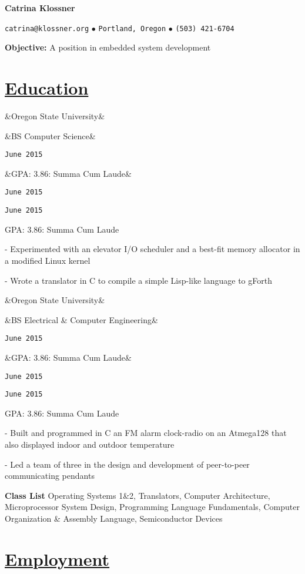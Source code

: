 \documentclass[11pt]{article}
\newcommand{\heading}[1]{
    \section*{\uline{\hfill #1}}
}
\newcommand{\squish}{
    \setlength{\itemsep}{0.5pt}
    \setlength{\parskip}{0pt}
    \setlength{\parsep}{0.5pt}
}
\newcommand{\when}[1]{
    \hfill \texttt{#1}
}
\newcommand{\experience}[4]{
    \ifx&#1&
       \item[{#1}]
       \when{}
    \else
        \ifx&#2&
            \item[{#1}]
            \when{#4}
        \else
            \ifx&#3&
                \item[{#1}, \emph{#2}]
                \when{#4}
            \else
                \item[{#1}, \emph{#2}]
                \when{#4}
                \item{#3}
                \when{}
            \fi
        \fi
    \fi
}
\newcommand{\contact}[4]{
    \centerline{
        \large       
        \texttt{#1}
        $\bullet$
        \texttt{#2}
        $\bullet$
        \texttt{#3}
    }
    \centerline{
        \emph{#4}
    }
}
\newcommand{\skill}[2]{
    \textbf{#1} \hfill #2
}
\newcommand{\CPP}{
    C\hspace{-.05em}\raisebox{.4ex}{\tiny\bf +}\hspace{-.10em}\raisebox{.4ex}{\tiny\bf +}
}
\begin{document}
\centerline{{\Huge \bf Catrina Klossner}}
\bigskip

\contact{catrina@klossner.org}
        {Portland, Oregon}
        {(503) 421-6704}
        {}

%
%
%
%

\large{\textbf{Objective:}}
	A position in embedded system development

\heading{Education}%

\begin{description}
\squish   
\experience{Oregon State University}
           {BS Computer Science}
           {GPA: 3.86: Summa Cum Laude}
           {June 2015}

	- Experimented with an elevator I/O scheduler and a best-fit memory allocator in a modified Linux kernel

	- Wrote a translator in C to compile a simple Lisp-like language to gForth 

\experience{Oregon State University}
           {BS Electrical \& Computer Engineering}
           {GPA: 3.86: Summa Cum Laude}
           {June 2015}

	- Built and programmed in C an FM alarm clock-radio on an Atmega128 that also displayed indoor and outdoor temperature 

	- Led a team of three in the design and development of peer-to-peer communicating pendants

\end{description}

\skill{Class List}{Operating Systems 1\&2, Translators, Computer Architecture, Microprocessor System Design, Programming Language Fundamentals, Computer Organization \& Assembly Language, Semiconductor Devices}


\heading{Employment}%
\end{document}
